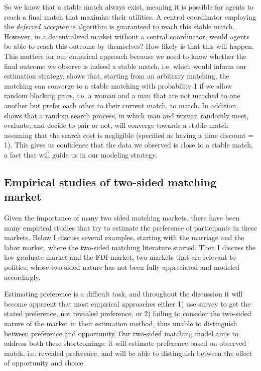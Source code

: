 So we know that a stable match always exist, meaning it is possible for agents
to reach a final match that maximize their utilities. A central coordinator
employing the \textit{deferred acceptance} algorithm is guaranteed to reach this
stable match. However, in a decentralized market without a central coordinator,
would agents be able to reach this outcome by themselves? How likely is that
this will happen. This matters for our empirical approach because we need to
know whether the final outcome we observe is indeed a stable match, i.e. which
would inform our estimation strategy.\citep{Roth2016} shows that, starting from
an arbitrary matching, the matching can converge to a stable matching with
probability 1 if we allow random blocking pairs, i.e. a woman and a man that are
not matched to one another but prefer each other to their current match, to
match. In addition, \citep{Adachi2003} shows that a random search process, in
which man and woman randomly meet, evaluate, and decide to pair or not, will
converge towards a stable match assuming that the search cost is negligible
(specified as having a time discount = 1). This gives us confidence that the
data we observed is close to a stable match, a fact that will guide us in our
modeling strategy.

\subsection{Empirical studies of two-sided matching market}

Given the importance of many two sided matching markets, there have been many
empirical studies that try to estimate the preference of participants in these
markets. Below I discuss several examples, starting with the marriage and the
labor market, where the two-sided matching literature started. Then I discuss
the law graduate market and the FDI market, two markets that are relevant to
politics, whose two-sided nature has not been fully appreciated and modeled
accordingly.

Estimating preference is a difficult task, and throughout the discussion it will
become apparent that most empirical approaches either 1) use survey to get the
stated preference, not revealed preference, or 2) failing to consider the
two-sided nature of the market in their estimation method, thus unable to
distinguish between preference and opportunity. Our two-sided matching model
aims to address both these shortcomings: it will estimate preference based on
observed match, i.e. revealed preference, and will be able to distinguish
between the effect of opportunity and choice.

